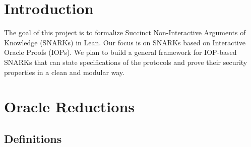 %

\chapter{Introduction}

The goal of this project is to formalize Succinct Non-Interactive Arguments of Knowledge (SNARKs) in Lean. Our focus is on SNARKs based on Interactive Oracle Proofs (IOPs). We plan to build a general framework for IOP-based SNARKs that can state specifications of the protocols and prove their security properties in a clean and modular way.

\chapter{Oracle Reductions}

\section{Definitions}

\begin{definition}
    \label{def:interactive_protocol_type_signature}
\end{definition}

\begin{definition}
    \label{def:prover_type_signature}
\end{definition}

\begin{definition}
    \label{def:verifier_type_signature}
\end{definition}

\begin{definition}
    \label{def:oracle_verifier_type_signature}
\end{definition}

